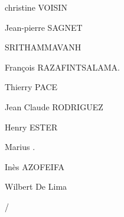 
\begin{minipage}[t]{.54\linewidth}
christine VOISIN

Jean-pierre SAGNET

 SRITHAMMAVANH

François RAZAFINTSALAMA.

Thierry PACE

Jean Claude RODRIGUEZ

Henry ESTER

Marius .

Inès AZOFEIFA

Wilbert De Lima
\end{minipage}
\hfill
\begin{minipage}[t]{.42\linewidth}
\uline{} / \uline{}
\end{minipage}


